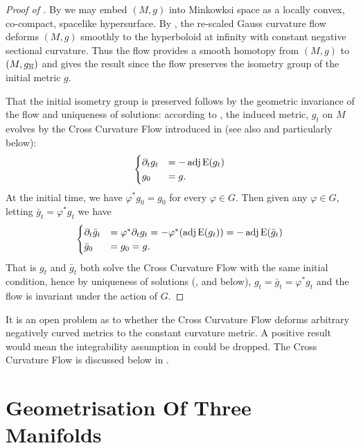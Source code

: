 \documentclass[a4paper, 12pt]{amsart}
\begin{document}
\begin{proof}
[Proof of ]

By  we may embed \((M, g)\) into Minkowksi space as a locally convex, co-compact, spacelike hypersurface. By \cite[Theorem 1.1]{MR3344442}, the re-scaled Gauss curvature flow deforms \((M, g)\) smoothly to the hyperboloid at infinity with constant negative sectional curvature. Thus the flow provides a smooth homotopy from \((M, g)\) to \((M, g_{\mathbb{H}})\) and  gives the result since the flow preserves the isometry group of the initial metric \(g\).

That the initial isometry group is preserved follows by the geometric invariance of the flow and uniqueness of solutions: according to \cite[12. Application to the cross-curvature flow]{MR3344442}, the induced metric, \(g_t\) on \(M\) evolves by the Cross Curvature Flow introduced in \cite{MR2055396} (see also  and particularly  below):
\[
\begin{cases}
\partial_t g_t &= -\operatorname{adj}\operatorname{E}(g_t) \\
g_0 &= g.
\end{cases}
\]
At the initial time, we have \(\varphi^{\ast} g_0 = g_0\) for every \(\varphi \in G\). Then given any \(\varphi \in G\), letting \(\bar{g}_t = \varphi^{\ast} g_t\) we have
\[
\begin{cases}
\partial_t \bar{g}_t &= \varphi^{\ast} \partial_t g_t = -\varphi^{\ast}(\operatorname{adj}\operatorname{E}(g_t)) = -\operatorname{adj}\operatorname{E}(\bar{g}_t) \\
\bar{g}_0 &= g_0 = g.
\end{cases}
\]
That is \(g_t\) and \(\bar{g}_t\) both solve the Cross Curvature Flow with the same initial condition, hence by uniqueness of solutions (\cite{MR2055396,MR2207496},  and  below), \(g_t = \bar{g}_t = \varphi^{\ast} g_t\) and the flow is invariant under the action of \(G\).
\end{proof}
\begin{rem}
It is an open problem as to whether the Cross Curvature Flow deforms arbitrary negatively curved metrics to the constant curvature metric. A positive result would mean the integrability assumption in  could be dropped. The Cross Curvature Flow is discussed below in .
\end{rem}
\section{Geometrisation Of Three Manifolds}
\label{sec:geometrisation}
\end{document}
